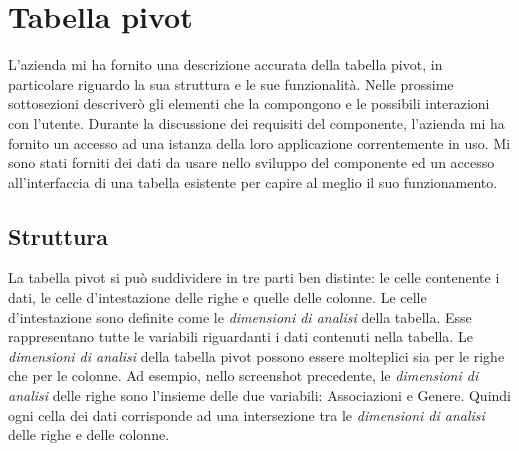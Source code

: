 \section{Tabella pivot}
L'azienda mi ha fornito una descrizione accurata della tabella pivot, in particolare riguardo la sua struttura e le sue funzionalità. Nelle prossime sottosezioni descriverò gli elementi che la compongono e le possibili interazioni con l'utente. Durante la discussione dei requisiti del componente, l'azienda mi ha fornito un accesso ad una istanza della loro applicazione correntemente in uso. Mi sono stati forniti dei dati da usare nello sviluppo del componente ed un accesso all'interfaccia di una tabella esistente per capire al meglio il suo funzionamento.
\begin{minipage}{\linewidth}
\end{minipage}

\subsection{Struttura}
La tabella pivot si può suddividere in tre parti ben distinte: le celle contenente i dati, le celle d'intestazione delle righe e quelle delle colonne. 
Le celle d'intestazione sono definite come le \emph{dimensioni di analisi} della tabella. Esse rappresentano tutte le variabili riguardanti i dati contenuti nella tabella. Le \emph{dimensioni di analisi} della tabella pivot possono essere molteplici sia per le righe che per le colonne. Ad esempio, nello screenshot precedente, le \emph{dimensioni di analisi} delle righe sono l'insieme delle due variabili: Associazioni e Genere. Quindi ogni cella dei dati corrisponde ad una intersezione tra le \emph{dimensioni di analisi} delle righe e delle colonne.

